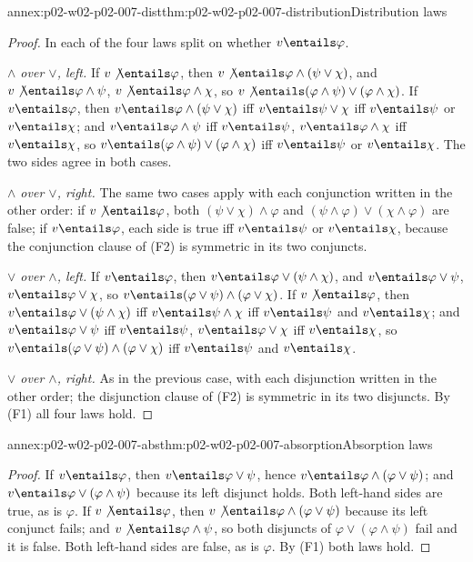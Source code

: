 \begin{annexitem}{annex:p02-w02-p02-007-dist}{thm:p02-w02-p02-007-distribution}{Distribution laws}
\begin{proof}
In each of the four laws split on whether \(v\entails\varphi\).

\emph{\(\land\) over \(\lor\), left.}  If \(v\not\entails\varphi\), then
\(v\not\entails\varphi\land(\psi\lor\chi)\), and
\(v\not\entails\varphi\land\psi\), \(v\not\entails\varphi\land\chi\), so
\(v\not\entails(\varphi\land\psi)\lor(\varphi\land\chi)\).  If
\(v\entails\varphi\), then \(v\entails\varphi\land(\psi\lor\chi)\) iff
\(v\entails\psi\lor\chi\) iff \(v\entails\psi\) or \(v\entails\chi\); and
\(v\entails\varphi\land\psi\) iff \(v\entails\psi\),
\(v\entails\varphi\land\chi\) iff \(v\entails\chi\), so
\(v\entails(\varphi\land\psi)\lor(\varphi\land\chi)\) iff
\(v\entails\psi\) or \(v\entails\chi\).  The two sides agree in both cases.

\emph{\(\land\) over \(\lor\), right.}  The same two cases apply with each
conjunction written in the other order: if \(v\not\entails\varphi\), both
\((\psi\lor\chi)\land\varphi\) and \((\psi\land\varphi)\lor(\chi\land\varphi)\)
are false; if \(v\entails\varphi\), each side is true iff
\(v\entails\psi\) or \(v\entails\chi\), because the conjunction clause of
(F2) is symmetric in its two conjuncts.

\emph{\(\lor\) over \(\land\), left.}  If \(v\entails\varphi\), then
\(v\entails\varphi\lor(\psi\land\chi)\), and \(v\entails\varphi\lor\psi\),
\(v\entails\varphi\lor\chi\), so
\(v\entails(\varphi\lor\psi)\land(\varphi\lor\chi)\).  If
\(v\not\entails\varphi\), then \(v\entails\varphi\lor(\psi\land\chi)\) iff
\(v\entails\psi\land\chi\) iff \(v\entails\psi\) and \(v\entails\chi\);
and \(v\entails\varphi\lor\psi\) iff \(v\entails\psi\),
\(v\entails\varphi\lor\chi\) iff \(v\entails\chi\), so
\(v\entails(\varphi\lor\psi)\land(\varphi\lor\chi)\) iff
\(v\entails\psi\) and \(v\entails\chi\).

\emph{\(\lor\) over \(\land\), right.}  As in the previous case, with each
disjunction written in the other order; the disjunction clause of (F2) is
symmetric in its two disjuncts.  By (F1) all four laws hold.
\end{proof}
\end{annexitem}

\begin{annexitem}{annex:p02-w02-p02-007-abs}{thm:p02-w02-p02-007-absorption}{Absorption laws}
\begin{proof}
If \(v\entails\varphi\), then \(v\entails\varphi\lor\psi\), hence
\(v\entails\varphi\land(\varphi\lor\psi)\); and
\(v\entails\varphi\lor(\varphi\land\psi)\) because its left disjunct holds.
Both left-hand sides are true, as is \(\varphi\).  If
\(v\not\entails\varphi\), then \(v\not\entails\varphi\land(\varphi\lor\psi)\)
because its left conjunct fails; and \(v\not\entails\varphi\land\psi\), so
both disjuncts of \(\varphi\lor(\varphi\land\psi)\) fail and it is false.
Both left-hand sides are false, as is \(\varphi\).  By (F1) both laws hold.
\end{proof}
\end{annexitem}

